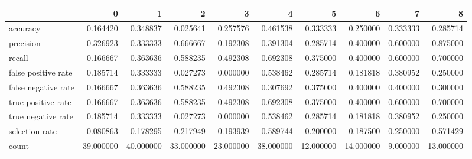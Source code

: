 \begin{tabular}{lrrrrrrrrr}
\toprule
{} &          0 &          1 &          2 &          3 &          4 &          5 &          6 &         7 &          8 \\
\midrule
accuracy            &   0.164420 &   0.348837 &   0.025641 &   0.257576 &   0.461538 &   0.333333 &   0.250000 &  0.333333 &   0.285714 \\
precision           &   0.326923 &   0.333333 &   0.666667 &   0.192308 &   0.391304 &   0.285714 &   0.400000 &  0.600000 &   0.875000 \\
recall              &   0.166667 &   0.363636 &   0.588235 &   0.492308 &   0.692308 &   0.375000 &   0.400000 &  0.600000 &   0.700000 \\
false positive rate &   0.185714 &   0.333333 &   0.027273 &   0.000000 &   0.538462 &   0.285714 &   0.181818 &  0.380952 &   0.250000 \\
false negative rate &   0.166667 &   0.363636 &   0.588235 &   0.492308 &   0.307692 &   0.375000 &   0.400000 &  0.400000 &   0.300000 \\
true positive rate  &   0.166667 &   0.363636 &   0.588235 &   0.492308 &   0.692308 &   0.375000 &   0.400000 &  0.600000 &   0.700000 \\
true negative rate  &   0.185714 &   0.333333 &   0.027273 &   0.000000 &   0.538462 &   0.285714 &   0.181818 &  0.380952 &   0.250000 \\
selection rate      &   0.080863 &   0.178295 &   0.217949 &   0.193939 &   0.589744 &   0.200000 &   0.187500 &  0.250000 &   0.571429 \\
count               &  39.000000 &  40.000000 &  33.000000 &  23.000000 &  38.000000 &  12.000000 &  14.000000 &  9.000000 &  13.000000 \\
\bottomrule
\end{tabular}
